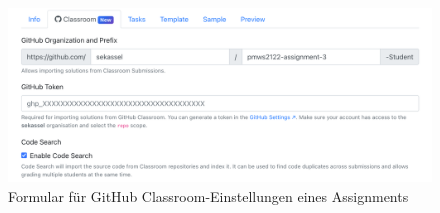 \begin{figure}
    \centering
    \includegraphics[width=\textwidth]{images/assignment-create-classroom}
    \caption{Formular für GitHub Classroom-Einstellungen eines Assignments}
    \label{fig:assignment-create-classroom}
\end{figure}

